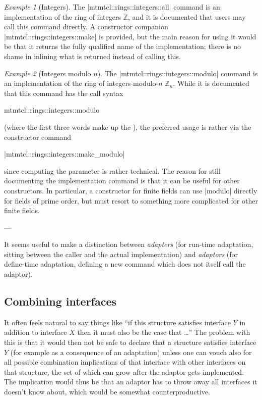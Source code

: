 \documentclass{mtmtcl}
\theoremstyle{plain}
\theoremstyle{remark}
\newtheorem*{example}{Example}
\begin{document}
\begin{example}[Integers]
  The |mtmtcl::rings::integers::all| command is an implementation of 
  the ring of integers $\mathbb{Z}$, and it is documented that users 
  may call this command directly. A constructor companion 
  |mtmtcl::rings::integers::make| is provided, but the main 
  reason for using it would be that it returns the fully qualified 
  name of the implementation; there is no shame in inlining what is 
  returned instead of calling this.
\end{example}

\begin{example}[Integers modulo $n$]
  The |mtmtcl::rings::integers::modulo| command is an implementation 
  of the ring of integers-modulo-$n$ $\mathbb{Z}_n$. While it is 
  documented that this command has the call syntax
  \begin{displaysyntax}
    mtmtcl::rings::integers::modulo   
     \regstar
  \end{displaysyntax}
  (where the first three words make up the ), the 
  preferred usage is rather via the constructor command
  \begin{displaysyntax}
    |mtmtcl::rings::integers::make_modulo| 
  \end{displaysyntax}
  since computing the  parameter is rather technical. The 
  reason for still documenting the implementation command is that it 
  can be useful for other constructors. In particular, a constructor 
  for finite fields can use |modulo| directly for fields of prime 
  order, but must resort to something more complicated for other 
  finite fields.
\end{example}



---

It seems useful to make a distinction between \emph{adapters} (for 
run-time adaptation, sitting between the caller and the actual 
implementation) and \emph{adaptors} (for define-time adaptation, 
defining a new command which does not itself call the adaptor).


\subsection{Combining interfaces}

It often feels natural to say things like ``if this structure 
satisfies interface $Y$ in addition to interface $X$ then it must 
also be the case that \dots'' The problem with this is that it would 
then not be safe to declare that a structure satisfies interface $Y$ 
(for example as a consequence of an adaptation) unless one can vouch 
also for all possible combination implications of that interface 
with other interfaces on that structure, the set of which can grow 
after the adaptor gets implemented. The implication would thus be 
that an adaptor has to throw away all interfaces it doesn't know 
about, which would be somewhat counterproductive.
\end{document}
